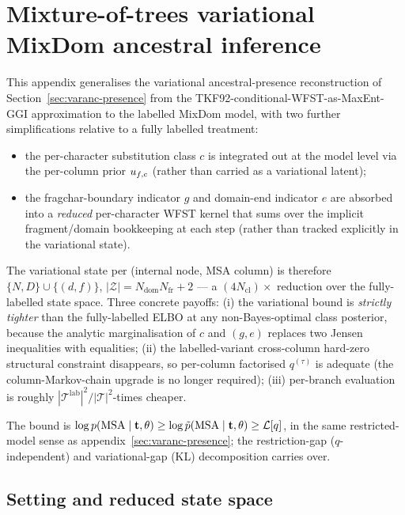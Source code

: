 
\section{Mixture-of-trees variational MixDom ancestral inference}
\label{sec:varanc-presence-mixdom}

This appendix generalises the variational ancestral-presence
reconstruction of Section~\ref{sec:varanc-presence} from the
TKF92-conditional-WFST-as-MaxEnt-GGI approximation to the labelled
MixDom model, with two further simplifications relative to a fully
labelled treatment:
\begin{itemize}[nosep]
\item the per-character substitution class $c$ is integrated out at
the model level via the per-column prior $u_{f, c}$
(rather than carried as a variational latent);
\item the fragchar-boundary indicator $g$ and domain-end indicator
$e$ are absorbed into a \emph{reduced} per-character WFST kernel that
sums over the implicit fragment/domain bookkeeping at each step
(rather than tracked explicitly in the variational state).
\end{itemize}
The variational state per (internal node, MSA column) is therefore
$\{N, D\} \cup \{(d, f)\}$, $|\mathcal{Z}| = N_{\text{dom}} N_{\text{fr}} + 2$
— a $(4 N_{\text{cl}})\times$ reduction over the fully-labelled state
space. Three concrete payoffs:
(i) the variational bound is \emph{strictly tighter} than the
fully-labelled ELBO at any non-Bayes-optimal class posterior, because
the analytic marginalisation of $c$ and $(g, e)$ replaces two Jensen
inequalities with equalities;
(ii) the labelled-variant cross-column hard-zero structural
constraint disappears, so per-column factorised $q^{(\tau)}$ is
adequate (the column-Markov-chain upgrade is no longer required);
(iii) per-branch evaluation is roughly
$|\mathcal{T}^{\text{lab}}|^2 / |\mathcal{T}|^2$-times cheaper.

The bound is $\log p(\text{MSA} \mid \mathbf{t}, \theta) \geq
\log \tilde{p}(\text{MSA} \mid \mathbf{t}, \theta) \geq
\mathcal{L}[q]$, in the same restricted-model sense as
appendix~\ref{sec:varanc-presence}; the
restriction-gap ($q$-independent) and variational-gap (KL)
decomposition carries over.

\subsection{Setting and reduced state space}
\label{sec:varanc-mixdom-setting}

